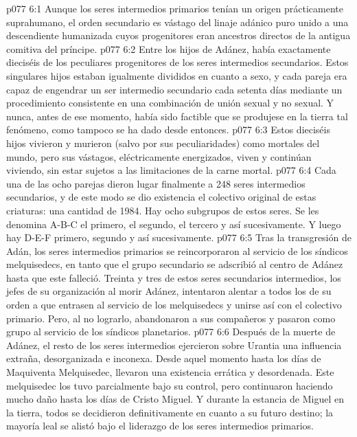 \vs p077 6:1 Aunque los seres intermedios primarios tenían un origen prácticamente suprahumano, el orden secundario es vástago del linaje adánico puro unido a una descendiente humanizada cuyos progenitores eran ancestros directos de la antigua comitiva del príncipe.
\vs p077 6:2 Entre los hijos de Adánez, había exactamente dieciséis de los peculiares progenitores de los seres intermedios secundarios. Estos singulares hijos estaban igualmente divididos en cuanto a sexo, y cada pareja era capaz de engendrar un ser intermedio secundario cada setenta días mediante un procedimiento consistente en una combinación de unión sexual y no sexual. Y nunca, antes de ese momento, había sido factible que se produjese en la tierra tal fenómeno, como tampoco se ha dado desde entonces.
\vs p077 6:3 Estos dieciséis hijos vivieron y murieron (salvo por sus peculiaridades) como mortales del mundo, pero sus vástagos, eléctricamente energizados, viven y continúan viviendo, sin estar sujetos a las limitaciones de la carne mortal.
\vs p077 6:4 Cada una de las ocho parejas dieron lugar finalmente a 248 seres intermedios secundarios, y de este modo se dio existencia el colectivo original de estas criaturas: una cantidad de 1984. Hay ocho subgrupos de estos seres. Se les denomina A\hyp{}B\hyp{}C el primero, el segundo, el tercero y así sucesivamente. Y luego hay D\hyp{}E\hyp{}F primero, segundo y así sucesivamente.
\vs p077 6:5 \pc Tras la transgresión de Adán, los seres intermedios primarios se reincorporaron al servicio de los síndicos melquisedecs, en tanto que el grupo secundario se adscribió al centro de Adánez hasta que este falleció. Treinta y tres de estos seres secundarios intermedios, los jefes de su organización al morir Adánez, intentaron alentar a todos los de su orden a que entrasen al servicio de los melquisedecs y unirse así con el colectivo primario. Pero, al no lograrlo, abandonaron a sus compañeros y pasaron como grupo al servicio de los síndicos planetarios.
\vs p077 6:6 Después de la muerte de Adánez, el resto de los seres intermedios ejercieron sobre Urantia una influencia extraña, desorganizada e inconexa. Desde aquel momento hasta los días de Maquiventa Melquisedec, llevaron una existencia errática y desordenada. Este melquisedec los tuvo parcialmente bajo su control, pero continuaron haciendo mucho daño hasta los días de Cristo Miguel. Y durante la estancia de Miguel en la tierra, todos se decidieron definitivamente en cuanto a su futuro destino; la mayoría leal se alistó bajo el liderazgo de los seres intermedios primarios.
